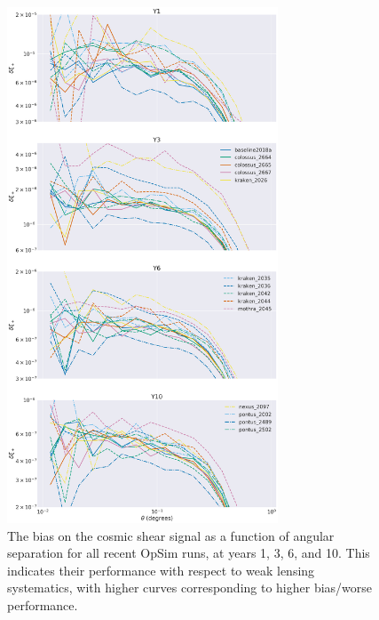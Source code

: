 \begin{figure}[htb]
    \centering
    \caption{The bias on the cosmic shear signal as a function of angular separation for all recent OpSim runs, at years 1, 3, 6, and 10. This indicates their performance with respect to weak lensing systematics, with higher curves corresponding to higher bias/worse performance.}
    \label{fig:WLSystematicsRankings}
\includegraphics[width=0.72\textwidth]{figures/WLSystematicsAllYears.png}
\end{figure}




